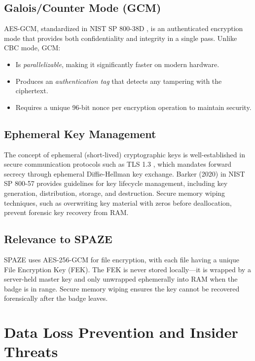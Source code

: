 \documentclass[conference]{IEEEtran}
\begin{document}
\subsection{Galois/Counter Mode (GCM)}
AES-GCM, standardized in NIST SP 800-38D \cite{aes_gcm_nist}, is an authenticated encryption mode that provides both confidentiality and integrity in a single pass. Unlike CBC mode, GCM:
\begin{itemize}[noitemsep]
    \item Is \textit{parallelizable}, making it significantly faster on modern hardware.
    \item Produces an \textit{authentication tag} that detects any tampering with the ciphertext.
    \item Requires a unique 96-bit nonce per encryption operation to maintain security.
\end{itemize}

\subsection{Ephemeral Key Management}
The concept of ephemeral (short-lived) cryptographic keys is well-established in secure communication protocols such as TLS 1.3 \cite{tls13}, which mandates forward secrecy through ephemeral Diffie-Hellman key exchange. Barker (2020) \cite{barker2020} in NIST SP 800-57 provides guidelines for key lifecycle management, including key generation, distribution, storage, and destruction. Secure memory wiping techniques, such as overwriting key material with zeros before deallocation, prevent forensic key recovery from RAM.

\subsection{Relevance to SPAZE}
SPAZE uses AES-256-GCM for file encryption, with each file having a unique File Encryption Key (FEK). The FEK is never stored locally—it is wrapped by a server-held master key and only unwrapped ephemerally into RAM when the badge is in range. Secure memory wiping ensures the key cannot be recovered forensically after the badge leaves.

\section{Data Loss Prevention and Insider Threats}
\label{sec:dlp}
\end{document}
